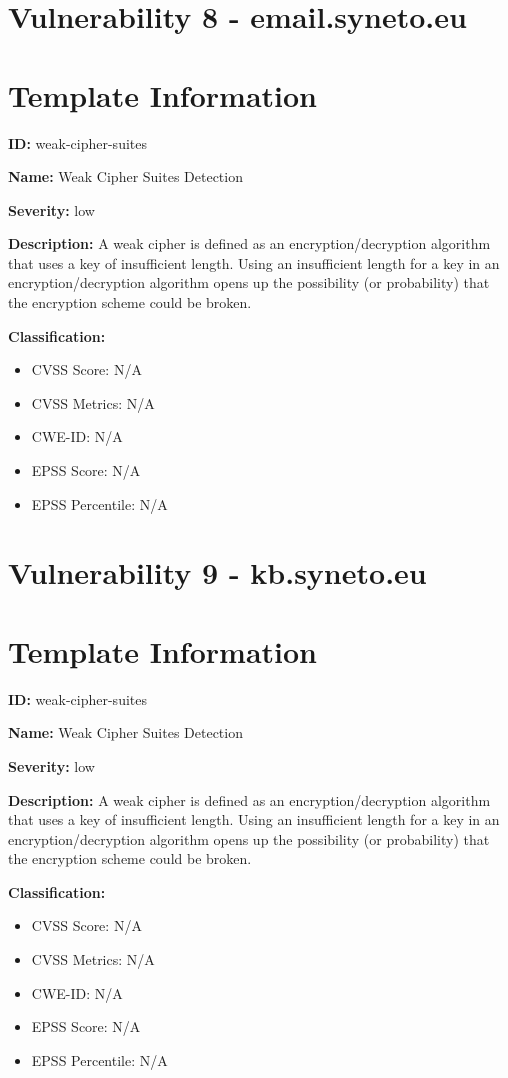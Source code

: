 \section*{Vulnerability 8 - email.syneto.eu}

\section*{Template Information}
\textbf{ID:} weak-cipher-suites

\textbf{Name:} Weak Cipher Suites Detection

\textbf{Severity:} low

\textbf{Description:} A weak cipher is defined as an encryption/decryption algorithm that uses a key of insufficient length. Using an insufficient length for a key in an encryption/decryption algorithm opens up the possibility (or probability) that the encryption scheme could be broken.

\textbf{Classification:}
\begin{itemize}
\item CVSS Score: N/A
\item CVSS Metrics: N/A
\item CWE-ID: N/A
\item EPSS Score: N/A
\item EPSS Percentile: N/A
\end{itemize}



\section*{Vulnerability 9 - kb.syneto.eu}

\section*{Template Information}
\textbf{ID:} weak-cipher-suites

\textbf{Name:} Weak Cipher Suites Detection

\textbf{Severity:} low

\textbf{Description:} A weak cipher is defined as an encryption/decryption algorithm that uses a key of insufficient length. Using an insufficient length for a key in an encryption/decryption algorithm opens up the possibility (or probability) that the encryption scheme could be broken.

\textbf{Classification:}
\begin{itemize}
\item CVSS Score: N/A
\item CVSS Metrics: N/A
\item CWE-ID: N/A
\item EPSS Score: N/A
\item EPSS Percentile: N/A
\end{itemize}



